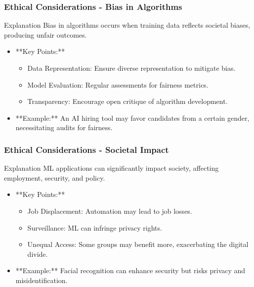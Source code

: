 \documentclass[aspectratio=169]{beamer}
\begin{document}
\begin{frame}[fragile]
    \frametitle{Ethical Considerations - Bias in Algorithms}
    \begin{block}{Explanation}
        Bias in algorithms occurs when training data reflects societal biases, producing unfair outcomes.
    \end{block}
    \begin{itemize}
        \item **Key Points:**
        \begin{itemize}
            \item Data Representation: Ensure diverse representation to mitigate bias.
            \item Model Evaluation: Regular assessments for fairness metrics.
            \item Transparency: Encourage open critique of algorithm development.
        \end{itemize}
        \item **Example:** An AI hiring tool may favor candidates from a certain gender, necessitating audits for fairness.
    \end{itemize}
\end{frame}

\begin{frame}[fragile]
    \frametitle{Ethical Considerations - Societal Impact}
    \begin{block}{Explanation}
        ML applications can significantly impact society, affecting employment, security, and policy.
    \end{block}
    \begin{itemize}
        \item **Key Points:**
        \begin{itemize}
            \item Job Displacement: Automation may lead to job losses.
            \item Surveillance: ML can infringe privacy rights.
            \item Unequal Access: Some groups may benefit more, exacerbating the digital divide.
        \end{itemize}
        \item **Example:** Facial recognition can enhance security but risks privacy and misidentification.
    \end{itemize}
\end{frame}
\end{document}
